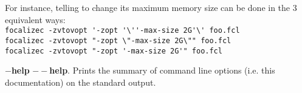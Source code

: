 \begin{compact-itemize}
    For instance, telling {\zenon} to change its maximum memory size can be
    done in the 3 equivalent ways:\\
    \verb+focalizec -zvtovopt '-zopt '\''-max-size 2G'\' foo.fcl+\\
    \verb+focalizec -zvtovopt "-zopt \"-max-size 2G\"" foo.fcl+\\
    \verb+focalizec -zvtovopt "-zopt '-max-size 2G'" foo.fcl+

  \item[*] {\bf $-$help} {\bf $--$help}. Prints the summary of command
    line options (i.e. this documentation) on the standard output.
\end{compact-itemize}
